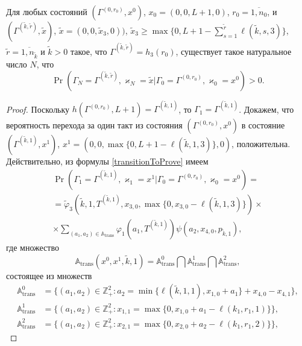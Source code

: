 \documentclass[a4paper,12pt,russian]{extarticle}
\begin{document}
\begin{lemma}\label{incycle:states}
Для любых состояний $(\Gamma^{(0,r_0)},x^0)$, $x_0=(0,0,L+1,0)$, $r_0=\overline{1,n_0}$, и
$(\Gamma^{(\tilde{k},\tilde{r})},\tilde{x})$,
$\tilde{x}=(0,0,\tilde{x}_3,0))$, $\tilde{x}_3\geqslant\max{\{0,L+1-\sum_{s=1}^{\tilde{r}} \ell(\tilde{k},s,3)\}}$,
$\tilde{r} = \overline{1,n_{\tilde{k}}}$ 
и $\tilde{k}>0$ такое, что 
$\Gamma^{(\tilde{k},\tilde{r})}=h_3(r_0)$, существует такое натуральное число $N$, что 
\begin{equation*}
\Pr(\Gamma_{N}=\Gamma^{(\tilde{k},\tilde{r} )}, \varkappa_{N}=\tilde{x}|
\Gamma_{0}=\Gamma^{(0,r_0)}, \varkappa_{0}=x^0)>0.
\end{equation*}
\end{lemma}
\begin{proof}
Поскольку $h(\Gamma^{(0,r_0)}, L+1) = \Gamma^{(\tilde{k},1)}$, то $\Gamma_1 = \Gamma^{(\tilde{k},1)}$. Докажем, что вероятность перехода за один такт из состояния $(\Gamma^{(0,r_0)},x^0)$ в состояние $(\Gamma^{(\tilde{k},1)},x^1)$, $x^1 = (0,0,\max{\{0,L+1-\ell(\tilde{k},1,3)\}},0)$, положительна.
Действительно, из формулы \eqref{transitionToProve} имеем
\begin{multline*}
\Pr(\Gamma_{1}=\Gamma^{(\tilde{k},1)}, \varkappa_{1}=x^1|
\Gamma_{0}=\Gamma^{(0,r_0)}, \varkappa_{0}=x^0)=\\
=\widetilde{\varphi}_3(\tilde{k},1,T^{(\tilde{k},1)},x_{3,0},\max{\{0,x_{3,0} - \ell(\tilde{k},1,3)\}}) \times \\ \times
\sum_{(a_1,a_2)\in {\mathbb A}_{\mathrm{trans}}}\varphi_1(a_1,T^{(\tilde{k},1)})  \psi(a_2,x_{4,0}, p_{\tilde{k},1}),
\end{multline*}
где множество 
\begin{equation*}
{\mathbb A}_{\mathrm{trans}}(x^0,x^1,\tilde{k},1) = {\mathbb A}_{\mathrm{trans}}^0 \bigcap {\mathbb A}_{\mathrm{trans}}^1\bigcap {\mathbb A}_{\mathrm{trans}}^2,
\end{equation*}
состоящее из множеств 
\begin{align*}
{\mathbb A}_{\mathrm{trans}}^0 &= \{(a_1,a_2) \in \mathbb{Z}_+^2 \colon a_2 = \min{\{\ell(\tilde{k},1,1), x_{1,0}+a_1}\} +x_{4,0}- x_{4,1}\},\\
{\mathbb A}_{\mathrm{trans}}^1 &= \{(a_1,a_2) \in \mathbb{Z}_+^2 \colon x_{1,1}=\max{\{0,x_{1,0}+a_1-\ell(k_1,r_1,1)\}}\},\\
 {\mathbb A}_{\mathrm{trans}}^2 &= \{(a_1,a_2) \in \mathbb{Z}_+^2 \colon  x_{2,1} =\max{\{0,x_{2,0}+a_2-\ell(k_1,r_1,2)\}}\},
\end{align*}

\end{proof}
\end{document}
